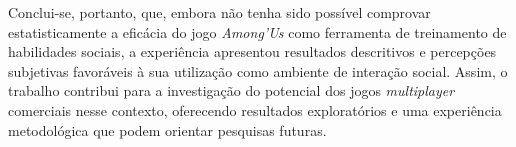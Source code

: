 Conclui-se, portanto, que, embora não tenha sido possível comprovar estatisticamente a eficácia do jogo \textit{Among’Us} como ferramenta de treinamento de habilidades sociais, a experiência apresentou resultados descritivos e percepções subjetivas favoráveis à sua utilização como ambiente de interação social. Assim, o trabalho contribui para a investigação do potencial dos jogos \textit{multiplayer} comerciais nesse contexto, oferecendo resultados exploratórios e uma experiência metodológica que podem orientar pesquisas futuras.